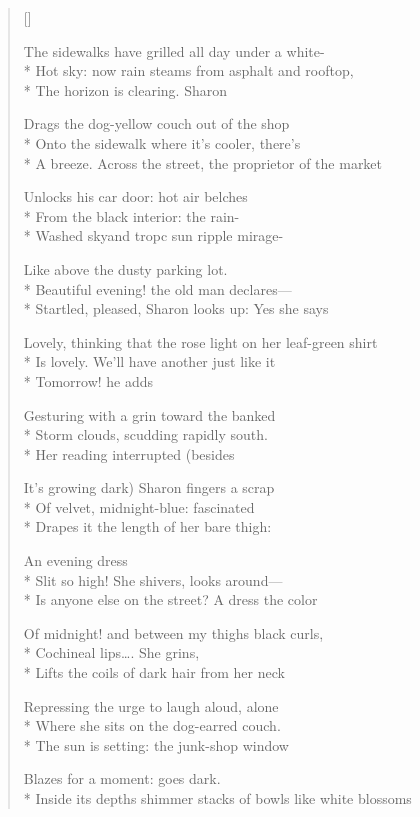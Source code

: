 \label{ch:sunset_on_market_street}
\settowidth{\versewidth}{Inside its depths shimmer stacks of bowls like white blossoms}
\begin{verse}[\versewidth]

The sidewalks have grilled all day under a white-\\*
Hot sky: now rain steams from asphalt and rooftop,\\*
The horizon is clearing.           Sharon

Drags the dog-yellow couch out of the shop\\*
Onto the sidewalk where it's cooler, there's\\*
A breeze.     Across the street, the proprietor of the market

Unlocks his car door: hot air belches\\*
From the black interior: the rain-\\*
Washed skyand tropc sun ripple mirage-

Like above the dusty parking lot.\\*
Beautiful evening! the old man declares---\\*
Startled, pleased, Sharon looks up: Yes she says

Lovely,  thinking that the rose light on her leaf-green shirt\\*
Is lovely. We'll have another just like it\\*
Tomorrow!  he adds

Gesturing with a grin toward the banked\\*
Storm clouds, scudding rapidly south.\\*
Her reading interrupted     (besides

It's growing dark)     Sharon fingers a scrap\\*
Of velvet, midnight-blue:     fascinated\\*
Drapes it the length of her bare thigh:

An evening dress\\*
Slit so high!   She shivers, looks around---\\*
Is anyone else on the street?     A dress the color

Of midnight!  and between my thighs black curls,\\*
Cochineal lips\ldots . She grins,\\*
Lifts the coils of dark hair from her neck


Repressing the urge to laugh aloud, alone\\*
Where she sits on the dog-earred couch.\\*
The sun is setting: the junk-shop window

Blazes for a moment: goes dark.\\*
Inside its depths shimmer stacks of bowls like white blossoms
\end{verse}
